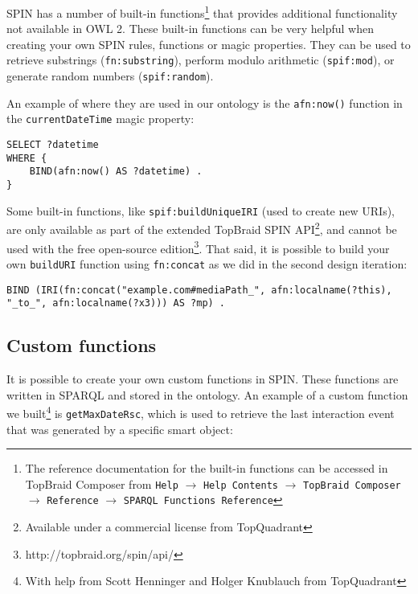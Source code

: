 \ac{SPIN} has a number of built-in functions\footnote{The reference documentation for the built-in functions can be accessed in TopBraid Composer from \texttt{Help} $\rightarrow$ \texttt{Help Contents} $\rightarrow$ \texttt{TopBraid Composer} $\rightarrow$ \texttt{Reference} $\rightarrow$ \texttt{SPARQL Functions Reference}} that provides additional functionality not available in \ac{OWL} 2. These built-in functions can be very helpful when creating your own \ac{SPIN} rules, functions or magic properties. They can be used to retrieve substrings (\texttt{fn:substring}), perform modulo arithmetic (\texttt{spif:mod}), or generate random numbers (\texttt{spif:random}).
	
An example of where they are used in our ontology is the \texttt{afn:now()} function in the \texttt{currentDateTime} magic property:

\begin{verbatim}
SELECT ?datetime
WHERE {
	BIND(afn:now() AS ?datetime) .
}
\end{verbatim}

Some built-in functions, like \texttt{spif:buildUniqueIRI} (used to create new URIs), are only available as part of the extended TopBraid SPIN API\footnote{Available under a commercial license from TopQuadrant}, and cannot be used with the free open-source edition\footnote{http://topbraid.org/spin/api/}. That said, it is possible to build your own \texttt{buildURI} function using \texttt{fn:concat} as we did in the second design iteration:

{\footnotesize
\begin{verbatim}
BIND (IRI(fn:concat("example.com#mediaPath_", afn:localname(?this), 
"_to_", afn:localname(?x3))) AS ?mp) .	
\end{verbatim}
}

\subsection{Custom functions}

It is possible to create your own custom functions in \ac{SPIN}. These functions are written in \ac{SPARQL} and stored in the ontology. An example of a custom function we built\footnote{With help from Scott Henninger and Holger Knublauch from TopQuadrant} is \texttt{getMaxDateRsc}, which is used to retrieve the last interaction event that was generated by a specific smart object:

